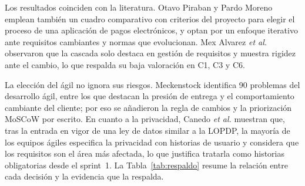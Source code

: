 \documentclass[11pt,a4paper]{article}
\begin{document}
Los resultados coinciden con la literatura. Otavo Piraban y Pardo Moreno
\cite{otavo2024} emplean también un cuadro comparativo con criterios del
proyecto para elegir el proceso de una aplicación de pagos electrónicos, y
optan por un enfoque iterativo ante requisitos cambiantes y normas que
evolucionan. Mex Alvarez \emph{et al.} \cite{mex2025} observaron que la
cascada solo destaca en gestión de requisitos y muestra rigidez ante el
cambio, lo que respalda su baja valoración en C1, C3 y C6.

La elección del ágil no ignora sus riesgos. Meckenstock \cite{meckenstock2024}
identifica 90 problemas del desarrollo ágil, entre los que destacan la
presión de entrega y el comportamiento cambiante del cliente; por eso se
añadieron la regla de cambios y la priorización MoSCoW por escrito. En
cuanto a la privacidad, Canedo \emph{et al.} \cite{canedo2022} muestran que,
tras la entrada en vigor de una ley de datos similar a la LOPDP, la mayoría
de los equipos ágiles especifica la privacidad con historias de usuario y
considera que los requisitos son el área más afectada, lo que justifica
tratarla como historias obligatorias desde el sprint~1. La
Tabla~\ref{tab:respaldo} resume la relación entre cada decisión y la
evidencia que la respalda.
\end{document}
